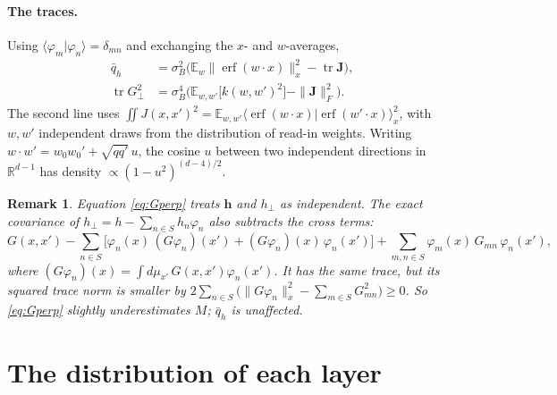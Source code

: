 \documentclass[11pt,a4paper]{article}
\newtheorem{remark}{Remark}
\newcommand{\E}{\mathbb{E}}
\newcommand{\erf}{\operatorname{erf}}
\newcommand{\tr}{\operatorname{tr}}
\begin{document}
\paragraph{The traces.}
Using $\langle\varphi_m|\varphi_n\rangle=\delta_{mn}$ and exchanging the $x$- and $w$-averages,
\begin{align}
  \bar q_h&=\sigma_B^2\Big(\E_w\|\erf(w\cdot x)\|_x^2-\tr \mathbf J\Big),
  \label{eq:qbar}\\
  \tr G_\perp^2&=\sigma_B^4\Big(\E_{w,w'}\big[k(w,w')^2\big]-\|\mathbf J\|_F^2\Big).
  \label{eq:trG2}
\end{align}
The second line uses $\iint J(x,x')^2=\E_{w,w'}\langle\erf(w\cdot x)|\erf(w'\cdot x)\rangle_x^2$, with $w,w'$ independent draws from the distribution of read-in weights.
Writing $w\cdot w'=w_0w_0'+\sqrt{qq'}\,u$, the cosine $u$ between two independent directions in $\mathbb R^{d-1}$ has density
$\propto(1-u^2)^{(d-4)/2}$.

\begin{remark}
Equation \eqref{eq:Gperp} treats $\mathbf h$ and $h_\perp$ as independent.
The exact covariance of $h_\perp=h-\sum_{n\in S}h_n\varphi_n$ also subtracts the cross terms:
\begin{equation*}
  G(x,x')-\sum_{n\in S}\Big[\varphi_n(x)\,(G\varphi_n)(x')+(G\varphi_n)(x)\,\varphi_n(x')\Big]+\sum_{m,n\in S}\varphi_m(x)\,G_{mn}\,\varphi_n(x'),
\end{equation*}
where $(G\varphi_n)(x)=\int d\mu_{x'}\,G(x,x')\varphi_n(x')$.
It has the same trace, but its squared trace norm is smaller by
$2\sum_{n\in S}\big(\|G\varphi_n\|_x^2-\sum_{m\in S}G_{mn}^2\big)\ge0$.
So \eqref{eq:Gperp} slightly underestimates $M$; $\bar q_h$ is unaffected.
\end{remark}

\section{The distribution of each layer}
\end{document}
